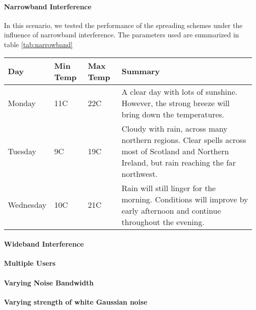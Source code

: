 	
	\paragraph{Narrowband Interference}
	In this scenario, we tested the performance of the spreading schemes under the influence of narrowband interference. The parameters used are summarized in table \ref{tab:narrowband}
	
	
	\begin{center}
	    \begin{tabular}{ | l | l | l | p{5cm} |}
	    \hline
	    Day & Min Temp & Max Temp & Summary \\ \hline
	    Monday & 11C & 22C & A clear day with lots of sunshine.  
	    However, the strong breeze will bring down the temperatures. \\ \hline
	    Tuesday & 9C & 19C & Cloudy with rain, across many northern regions. Clear spells
	    across most of Scotland and Northern Ireland,
	    but rain reaching the far northwest. \\ \hline
	    Wednesday & 10C & 21C & Rain will still linger for the morning.
	    Conditions will improve by early afternoon and continue
	    throughout the evening. \\
	    \hline
	    \end{tabular}
	\end{center}
	
	
	\paragraph{Wideband Interference}
	\paragraph{Multiple Users}
	\paragraph{Varying Noise Bandwidth}
	\paragraph{Varying strength of white Gaussian noise}
	
	
	
	
